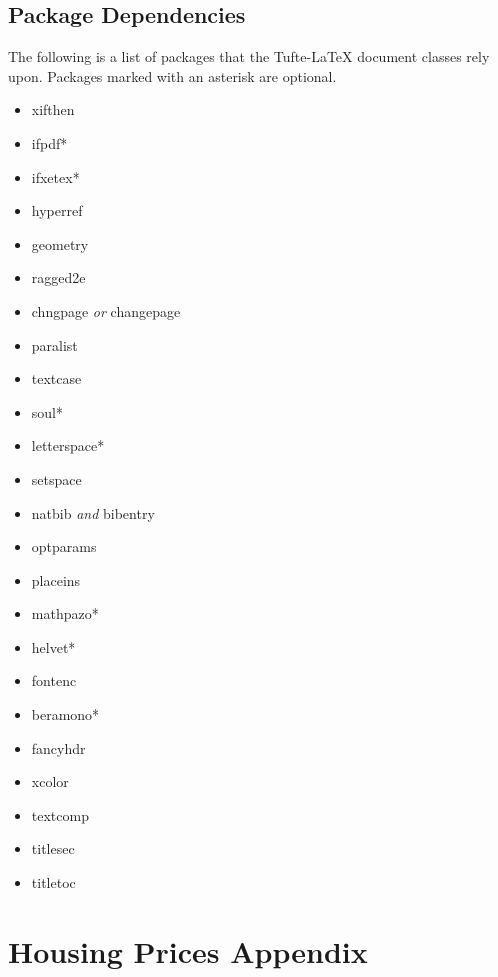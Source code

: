 \documentclass[a4paper, twoside, nobib]{tufte-book}
\newcommand{\TL}{Tufte-\LaTeX\xspace}
\begin{document}
\section{Package Dependencies}\label{sec:dependencies}
The following is a list of packages that the \TL document
classes rely upon.  Packages marked with an asterisk are optional.
\begin{multicols}{2}
\begin{itemize}
  \item xifthen
  \item ifpdf*
  \item ifxetex*
  \item hyperref
  \item geometry
  \item ragged2e
  \item chngpage \emph{or} changepage
  \item paralist
  \item textcase
  \item soul*
  \item letterspace*
  \item setspace
  \item natbib \emph{and} bibentry
  \item optparams
  \item placeins
  \item mathpazo*
  \item helvet*
  \item fontenc
  \item beramono*
  \item fancyhdr
  \item xcolor
  \item textcomp
  \item titlesec
  \item titletoc
\end{itemize}
\end{multicols}


\appendix
\chapter{Housing Prices Appendix}
\end{document}
